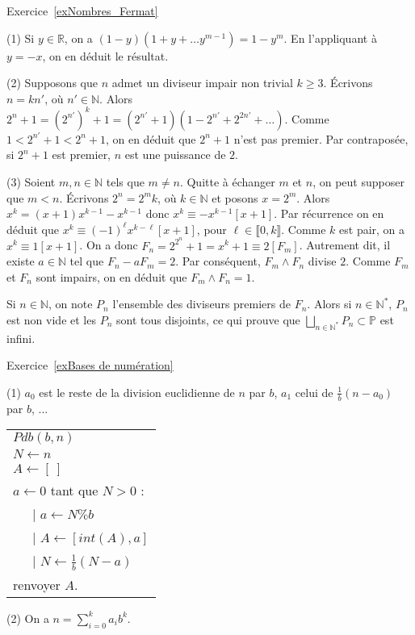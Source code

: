 \documentclass[11pt,a4paper]{article}
\newcommand{\N}{\mathbb{N}}
\newcommand{\R}{\mathbb{R}}
\begin{document}
Exercice~\ref{exNombres_Fermat}

(1) Si $y\in \R$, on a  $(1-y)(1+y+\ldots y^{m-1})=1-y^m$. En l'appliquant à $y=-x$, on en déduit le résultat.

(2) Supposons que $n$ admet un diviseur impair non trivial $k\geq 3$. Écrivons $n=kn'$, où $n'\in \N$. Alors $2^n+1=(2^{n'})^k+1=(2^{n'}+1)(1-2^{n'}+2^{2n'}+\ldots)$. Comme $1<2^{n'}+1<2^n+1$, on en déduit que $2^n+1$ n'est pas premier. Par contraposée, si $2^n+1$ est premier, $n$ est une puissance de $2$.

(3) Soient $m,n\in \N$ tels que $m\neq n$. Quitte à échanger $m$ et $n$, on peut supposer que $m<n$. Écrivons $2^n=2^m k$, où $k\in \N$ et posons $x=2^m$. Alors $x^k=(x+1)x^{k-1}-x^{k-1}$ donc $x^k\equiv -x^{k-1}[x+1]$.  Par récurrence on en déduit que $x^k\equiv (-1)^\ell x^{k-\ell} [x+1]$, pour $\ell\in \llbracket 0,k\rrbracket$. 
Comme $k$ est pair, on a $x^k\equiv 1 [x+1]$. On a donc $F_{n}=2^{2^n}+1=x^k+1\equiv 2[F_m]$. Autrement dit, il existe $a\in \N$  tel que $F_n -a F_m =2$. Par conséquent, $F_m\wedge F_n $ divise $2$. Comme $F_m$ et $F_n$ sont impairs, on en déduit que $F_m\wedge F_n =1$. 

Si $n\in \N$, on note $P_n$ l'ensemble des diviseurs premiers de $F_n$. Alors si $n\in \N^*$, $P_n$ est non vide et les $P_n$ sont tous disjoints, ce qui prouve que $\bigsqcup_{n\in \N^*}  P_n\subset \mathbb{P}$ est infini.


Exercice~\ref{exBases de numération}


(1) $a_0$ est le reste de la division euclidienne de $n$ par $b$, $a_1$ celui de $\frac{1}{b}(n-a_0)$ par $b$, ...

\begin{center}
\begin{tabular}{l}
$Pdb(b,n)$\\
$N\leftarrow n$ \\
$A\leftarrow [\ ]$\\
$a\leftarrow 0$
tant que $N>0$ : \\
\ \ \ {\rm |} $a\leftarrow N \%b$\\
\ \ \ {\rm |} $A\leftarrow [int(A),a]$\\
\ \ \ {\rm |}  $N\leftarrow \frac{1}{b} (N-a)$ \\
renvoyer $A$.



\end{tabular}
\end{center}

(2) On a $n=\sum_{i=0}^k a_i b^k$. 
\end{document}
